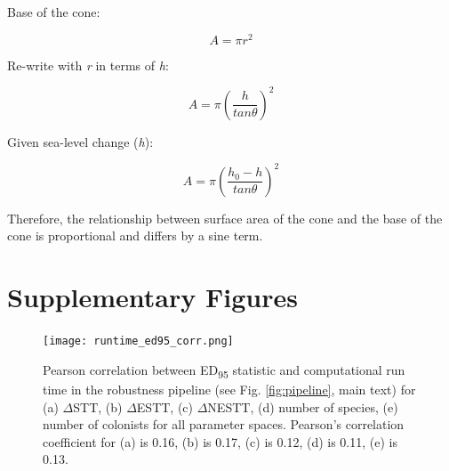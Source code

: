Base of the cone: 

\[ A = \pi r^2 \]

Re-write with \textit{r} in terms of \textit{h}:

\[ A = \pi \left( \frac{h}{tan \theta} \right)^2 \]

Given sea-level change (\textit{h}): 

\[ A = \pi \left( \frac{h_0 - h}{tan \theta} \right) ^2 \]

Therefore, the relationship between surface area of the cone and the base of the cone is proportional and differs by a sine term.

\clearpage

\section*{Supplementary Figures}

\begin{figure}[ht]
    \centering
    \texttt{[image: runtime\_ed95\_corr.png]}
    \caption{Pearson correlation between ED\textsubscript{95} statistic and computational run time in the robustness pipeline (see Fig. \ref{fig:pipeline}, main text) for (a) $\Delta$STT, (b) $\Delta$ESTT, (c) $\Delta$NESTT, (d) number of species, (e) number of colonists for all parameter spaces. Pearson’s correlation coefficient for (a) is 0.16, (b) is 0.17, (c) is 0.12, (d) is 0.11, (e) is 0.13.}
    \label{fig:runtime_ed95_corr}
\end{figure}

